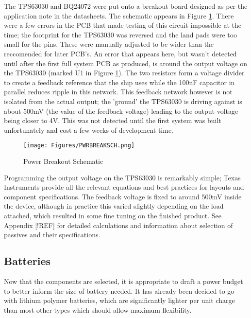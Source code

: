 \documentclass[12pt,openany,a4paper]{book}
\begin{document}
		The TPS63030 and BQ24072 were put onto a breakout board designed as per the application note in the datasheets. The schematic appears in Figure \ref{fig:PWRBREAKSCH}. There were a few errors in the PCB that made testing of this circuit impossible at the time; the footprint for the TPS63030 was reversed and the land pads were too small for the pins. These were manually adjusted to be wider than the reccomended for later PCB's. An error that appears here, but wasn't detected until after the first full system PCB as produced, is around the output voltage on the TPS63030 (marked U1 in Figure \ref{fig:PWRBREAKSCH}). The two resistors form a voltage divider to create a feedback reference that the ship uses while the 100nF capacitor in parallel reduces ripple in this network. This feedback network however is not isolated from the actual output; the 'ground' the TPS63030 is driving against is about 500mV (the value of the feedback voltage) leading to the output voltage being closer to 4V. This was not detected until the first system was built unfortunately and cost a few weeks of development time. \\
		
		\begin{figure}[H]
			\centering
			\texttt{[image: Figures/PWRBREAKSCH.png]}
			\caption{Power Breakout Schematic}
			\label{fig:PWRBREAKSCH}
		\end{figure}	
		
		Programming the output voltage on the TPS63030 is remarkably simple; Texas Instruments provide all the relevant equations and best practices for layouts and component specifications. The feedback voltage is fixed to around 500mV inside the device, although in practice this varied slightly depending on the load attached, which resulted in some fine tuning on the finished product. See Appendix [!REF] for detailed calculations and information about selection of passives and their specifications.
		
		\subsection{Batteries}
		Now that the components are selected, it is appropriate to draft a power budget to better inform the size of battery needed. It has already been decided to go with lithium polymer batteries, which are significantly lighter per unit charge than most other types which should allow maximum flexibility. \\
		
\end{document}
